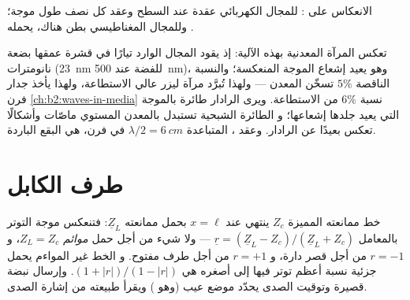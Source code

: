 \begin{omfigure}

{\small الانعكاس على : للمجال الكهربائي
عقدة عند السطح وعقد  كل نصف
طول موجة؛ وللمجال المغناطيسي بطن هناك، يحمله
.}
\end{omfigure}

\begin{example}\label{ex:b2:wave-interfaces:conductoruses}
تعكس المرآة المعدنية بهذه الآلية: إذ يقود المجال الوارد
تيارًا في قشرة عمقها بضعة نانومترات (\qty{23}{nm} للفضة عند
\qty{500}{nm})، وهو يعيد إشعاع الموجة المنعكسة؛ والنسبة الناقصة $5\%$
تسخّن المعدن --- ولهذا تُبرَّد مرآة ليزر عالي الاستطاعة،
ولهذا يأخذ جدار فرن \cref{ch:b2:waves-in-media} نسبة $6\%$ من
الاستطاعة. ويرى الرادار طائرة بالموجة التي يعيد جلدها إشعاعها؛ و
الطائرة الشبحية تستبدل بالمعدن المستوي ماصّات وأشكالًا
تعكس بعيدًا عن الرادار. وعقد ، المتباعدة $\lambda/2 =
\qty{6}{cm}$ في فرن، هي البقع الباردة.
\end{example}

\section{طرف الكابل}

\begin{proposition}\label{prop:b2:wave-interfaces:coax}
خط ممانعته المميزة $Z_c$ ينتهي عند $x = \ell$ بحمل
ممانعته $\underline Z_L$: فتنعكس موجة التوتر بالمعامل $\underline r =
(\underline Z_L - Z_c)/(\underline Z_L + Z_c)$ --- ولا شيء من أجل حمل \emph{موائم}
$Z_L = Z_c$، و $r = -1$ من أجل قصر دارة، و $r = +1$ من أجل طرف مفتوح. و
الخط غير المواءم يحمل  جزئية نسبة أعظم توتر فيها
إلى أصغره هي \emph{} $(1 + |r|)/(1 - |r|)$.
وإرسال نبضة قصيرة وتوقيت الصدى يحدّد موضع عيب (وهو ) ويقرأ طبيعته من إشارة الصدى.
\end{proposition}

